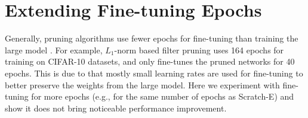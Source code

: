 \section{Extending Fine-tuning Epochs}
Generally, pruning algorithms  use fewer epochs for fine-tuning than training the large model \citep{li2016pruning,he2017channel,luo2017thinet}. For example, $L_1$-norm based filter pruning \citep{li2016pruning} uses 164 epochs for training on CIFAR-10 datasets, and only fine-tunes the pruned networks for 40 epochs. This is due to that mostly small learning rates are used for fine-tuning to better preserve the weights from the large model.
Here we experiment with fine-tuning for more epochs (e.g., for the same number of epochs as Scratch-E) and show it does not bring noticeable performance improvement. 

\setlength{\tabcolsep}{5pt}
\renewcommand{\arraystretch}{1.2}
\begin{table}[!htbp]
\small
\centering
{}
\vspace{1ex}
\caption{``Fine-tune-40'' stands for fine-tuning 40 epochs and so on. Scratch-E models are trained for 160 epochs. We observe that fine-tuning for more epochs does not help improve the accuracy much, and models trained from scratch can still perform on par with fine-tuned models.
}
\label{finetune-more}
\vspace{-3ex}
\end{table}
